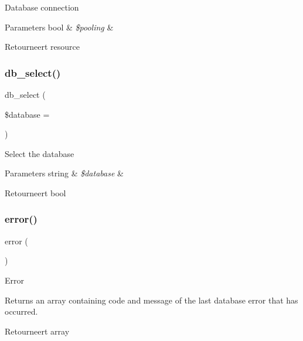 Database connection


\begin{DoxyParams}[1]{Parameters}
bool & {\em \$pooling} & \\
\hline
\end{DoxyParams}
\begin{DoxyReturn}{Retourneert}
resource 
\end{DoxyReturn}
\mbox{\label{class_c_i___d_b__sqlsrv__driver_a18ae9c21870b30b45337c5e3626190cc}} 
\subsubsection{\texorpdfstring{db\_select()}{db\_select()}}
{\footnotesize\ttfamily db\+\_\+select (\begin{DoxyParamCaption}\item[{}]{\$database = {\ttfamily \textquotesingle{}\textquotesingle{}} }\end{DoxyParamCaption})}

Select the database


\begin{DoxyParams}[1]{Parameters}
string & {\em \$database} & \\
\hline
\end{DoxyParams}
\begin{DoxyReturn}{Retourneert}
bool 
\end{DoxyReturn}
\mbox{\label{class_c_i___d_b__sqlsrv__driver_a43b8d30b879d4f09ceb059b02af2bc02}} 
\subsubsection{\texorpdfstring{error()}{error()}}
{\footnotesize\ttfamily error (\begin{DoxyParamCaption}{ }\end{DoxyParamCaption})}

Error

Returns an array containing code and message of the last database error that has occurred.

\begin{DoxyReturn}{Retourneert}
array 
\end{DoxyReturn}
\mbox{\label{class_c_i___d_b__sqlsrv__driver_a90355121e1ed009e0efdbd544ab56efa}} 
